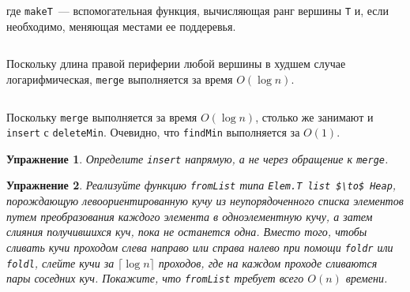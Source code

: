 \documentclass[aspectratio=169
  , xcolor={svgnames}
  , hyperref={ colorlinks,citecolor=DeepPink4
             , linkcolor=DarkRed,urlcolor=DarkBlue}
  , russian
  ]{beamer}
\theoremstyle{exerciseStyle1}
\newtheorem{exercise}{\textbf{Упражнение}}[section]
\begin{document}
\begin{frame}[fragile]{}
\inputminted[firstline=23, lastline=26] {haskell}{code/Heap.hs}

где \lstinline!makeT!~--- вспомогательная функция, вычисляющая ранг
вершины \lstinline!T! и, если необходимо, меняющая местами ее
поддеревья.

\inputminted[firstline=30, lastline=35] {haskell}{code/Heap.hs}

Поскольку длина правой периферии любой вершины в худшем случае
логарифмическая, \lstinline!merge! выполняется за время $O(\log n)$.
\end{frame}

\begin{frame}[fragile]{}
\inputminted[firstline=36, lastline=38] {haskell}{code/Heap.hs}

Поскольку \lstinline!merge! выполняется за время $O(\log n)$, столько
же занимают и \lstinline!insert! с \lstinline!deleteMin!. Очевидно,
что \lstinline!findMin! выполняется за $O(1)$. 
\end{frame}

\begin{frame}[fragile]{}
\begin{exercise}\label{ex:3.2}
  Определите \lstinline!insert! напрямую, а не через обращение к \lstinline!merge!.
\end{exercise}

\begin{exercise}\label{ex:3.3}
  Реализуйте функцию \lstinline!fromList! типа \lstinline!Elem.T list $\to$ Heap!,
  порождающую левоориентированную кучу из неупорядоченного списка
  элементов путем преобразования каждого элемента в одноэлементную
  кучу, а затем слияния получившихся куч, пока не останется
  одна. Вместо того, чтобы сливать кучи проходом слева направо или
  справа налево при помощи \lstinline!foldr! или \lstinline!foldl!,
  слейте кучи за $\lceil \log n \rceil$ проходов, где на каждом
  проходе сливаются пары соседних куч. Покажите, что
  \lstinline!fromList! требует всего $O(n)$ времени.
\end{exercise}
\end{frame}
\end{document}
